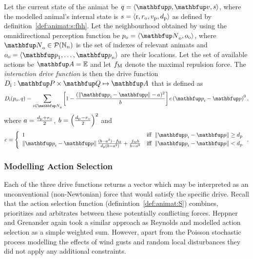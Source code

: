 \begin{definition}
\label{def:animat:Di:fhh}
Let the current state of the animat be $q=\langle\vect{p},\vect{v},s\rangle$, where the modelled animal's internal state is $s=\langle\mathrm{r},r_\textnormal{o},v_\textnormal{p},d_\textnormal{p}\rangle$ as defined by definition~\ref{def:animat:s:fhh}. Let the neighbourhood obtained by using the omnidirectional perception function be $p_\textnormal{o}=\langle\set{N}_\textnormal{o},o_\textnormal{o}\rangle$, where $\set{N}_\textnormal{o} \in \powset{\N_n}$ is the set of indexes of relevant animats and $o_\textnormal{o}=\langle\vect{p}_1,\ldots,\vect{p}_n\rangle$ are their locations. Let the set of available actions be $\set{A}=\E$ and let $f_\textnormal{M}$ denote the maximal repulsion force. The \emph{interaction drive function} is then the drive function $D_\textnormal{i}: \set{P} \times \set{Q} \mapsto \set{A}$ that is defined as 
\begin{equation}
D_\textnormal{i}(p_\textnormal{o}, q) = \sum_{i \in \set{N}_\textnormal{o}} \left[1-\frac{(\left\|\vect{p}_i-\vect{p}\right\|-a)^2}{b}\right] c \left(\vect{p}_i-\vect{p}\right)^0, \label{eq:animat:Di:fhh}
\end{equation}
where $a=\frac{d_\textnormal{p}+r_\textnormal{o}}{2}$, $b=\left(\frac{d_\textnormal{p}-r_\textnormal{o}}{2}\right)^2$ and 
\begin{equation}
c = \left\{
\begin{array}{ll}
1 & \mathrm{iff}\ \left\|\vect{p}_i-\vect{p}\right\| \geq d_\textnormal{p} \\
\left\|\vect{p}_i-\vect{p}\right\|\frac{(b-a^2)-f_\textnormal{M}}{d_\textnormal{p}(b-a^2)}+\frac{f_\textnormal{M}b}{b-a^2} & \mathrm{iff}\ \left\|\vect{p}_i-\vect{p}\right\| < d_\textnormal{p}
\end{array}
\right..
\end{equation}
\end{definition}

\subsubsection{Modelling Action Selection}
Each of the three drive functions returns a vector which may be interpreted as an unconventional (non-Newtonian) \cite{heppner:1990} force that would satisfy the specific drive. Recall that the action selection function (definintion~\ref{def:animat:S}) combines, prioritizes and arbitrates between these potentially conflicting forces. Heppner and Grenander again took a similar approach as Reynolds and modelled action selection as a simple weighted sum. However, apart from the Poisson stochastic process modelling the effects of wind gusts and random local disturbances they did not apply any additional constraints.

